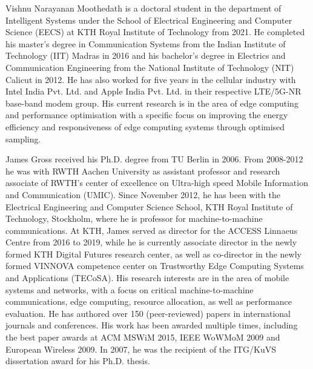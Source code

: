 \begin{IEEEbiography}{Vishnu Narayanan Moothedath }is a doctoral student in the department of Intelligent Systems under the School of Electrical Engineering and Computer Science (EECS) at KTH Royal Institute of Technology from 2021. He completed his master's degree in Communication Systems from the Indian Institute of Technology (IIT) Madras in 2016 and his bachelor's degree in Electrics and Communication Engineering from the National Institute of Technology (NIT) Calicut in 2012. He has also worked for five years in the cellular industry with Intel India Pvt. Ltd. and Apple India Pvt. Ltd. in their respective LTE/5G-NR base-band modem group. His current research is in the area of edge computing and performance optimisation with a specific focus on improving the energy efficiency and responsiveness of edge computing systems through optimised sampling. 
\end{IEEEbiography}
\begin{IEEEbiography}{James Gross }received his Ph.D. degree from TU Berlin in 2006. From 2008-2012 he was with RWTH Aachen University as assistant professor and research associate of RWTH’s center of excellence on Ultra-high speed Mobile Information and Communication (UMIC). Since November 2012, he has been with the Electrical Engineering and Computer Science School, KTH Royal Institute of Technology, Stockholm, where he is professor for machine-to-machine communications. At KTH, James served as director for the ACCESS Linnaeus Centre from 2016 to 2019, while he is currently associate director in the newly formed KTH Digital Futures research center, as well as co-director in the newly formed VINNOVA competence center on Trustworthy Edge Computing Systems and Applications (TECoSA). His research interests are in the area of mobile systems and networks, with a focus on critical machine-to-machine communications, edge computing, resource allocation, as well as performance evaluation. He has authored over 150 (peer-reviewed) papers in international journals and conferences. His work has been awarded multiple times, including the best paper awards at ACM MSWiM 2015, IEEE WoWMoM 2009 and European Wireless 2009. In 2007, he was the recipient of the ITG/KuVS dissertation award for his Ph.D. thesis.
\end{IEEEbiography}